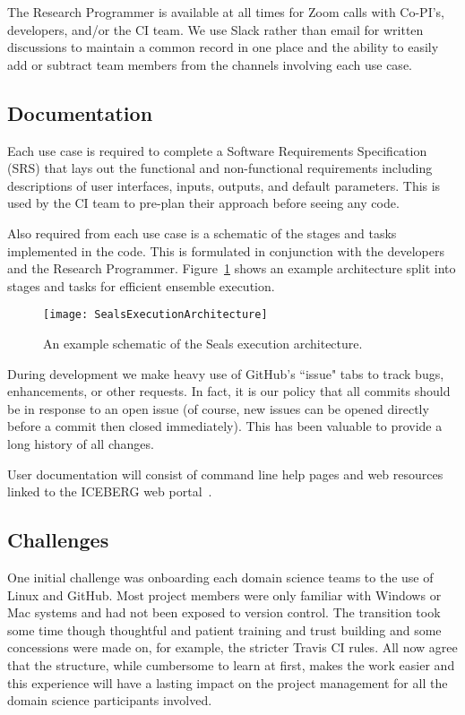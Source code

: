 \documentclass[manuscript,screen]{acmart}
\begin{document}
The Research Programmer is available at all times for Zoom calls with Co-PI's, developers, and/or the CI team. We use Slack rather than email for written discussions to maintain a common record in one place and the ability to easily add or subtract team members from the channels involving each use case.

\subsection{Documentation}
Each use case is required to complete a Software Requirements Specification (SRS) that lays out the functional and non-functional requirements including descriptions of user interfaces, inputs, outputs, and default parameters.
This is used by the CI team to pre-plan their approach before seeing any code.

Also required from each use case is a schematic of the stages and tasks
implemented in the code. This is formulated in conjunction with the developers and the Research Programmer. 
Figure~\ref{fig:sealsarch} shows an example architecture split into stages and tasks for efficient ensemble execution.

\begin{figure}[h]
	\centering
	\texttt{[image: SealsExecutionArchitecture]}
	\caption{An example schematic of the Seals execution architecture.}
	\label{fig:sealsarch}
\end{figure}

During development we make heavy use of GitHub's ``issue" tabs to track bugs, enhancements, or other requests.  In fact, it is our policy that all 
commits should be in response to an open issue (of course, new issues can be opened directly before a commit then closed immediately).  This has been valuable to provide a long history of all changes.

User documentation will consist of command line help pages and web resources
linked to the ICEBERG web portal~\cite{icebergweb:20}.

\subsection{Challenges}
One initial challenge was onboarding each domain science teams to the use of Linux and GitHub. Most project members were only familiar with Windows or Mac systems and had not been  exposed to version control. The transition took some time though thoughtful and patient training and trust building and some concessions were made on, for example, the stricter Travis CI rules. All now agree that the structure, while cumbersome to learn at first, makes the 
work easier and this experience will have a lasting impact on the project management for all the domain science participants involved.
\end{document}
